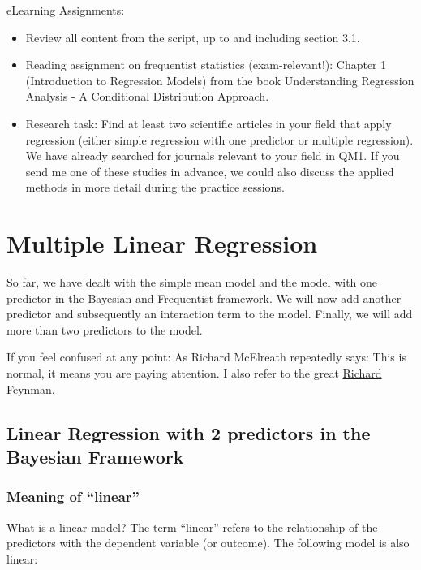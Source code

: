 \documentclass[
]{book}
\providecommand{\tightlist}{%
  \setlength{\itemsep}{0pt}\setlength{\parskip}{0pt}}
\begin{document}
eLearning Assignments:

\begin{itemize}
\tightlist
\item
  Review all content from the script, up to and including section 3.1.
\item
  Reading assignment on frequentist statistics (exam-relevant!):
  Chapter 1 (Introduction to Regression Models) from the book
  Understanding Regression Analysis - A Conditional Distribution Approach.
\item
  Research task: Find at least two scientific articles in your field that apply
  regression (either simple regression with one predictor or multiple regression).
  We have already searched for journals relevant to your field in QM1.
  If you send me one of these studies in advance, we could also discuss the
  applied methods in more detail during the practice sessions.
\end{itemize}

\chapter{Multiple Linear Regression}\label{multiple-linear-regression}

So far, we have dealt with the simple mean model and the model with one predictor
in the Bayesian and Frequentist framework.
We will now add another predictor and subsequently an interaction term to the model.
Finally, we will add more than two predictors to the model.

If you feel confused at any point: As Richard McElreath repeatedly says:
This is normal, it means you are paying attention. I also refer to the
great \href{https://www.youtube.com/watch?v=lytxafTXg6c&ab_channel=sdfhsfh}{Richard Feynman}.

\section{Linear Regression with 2 predictors in the Bayesian Framework}\label{linear-regression-with-2-predictors-in-the-bayesian-framework}

\subsection{Meaning of ``linear''}\label{meaning-of-linear}

What is a linear model? The term ``linear'' refers to the relationship of the predictors
with the dependent variable (or outcome). The following model is also linear:
\end{document}
